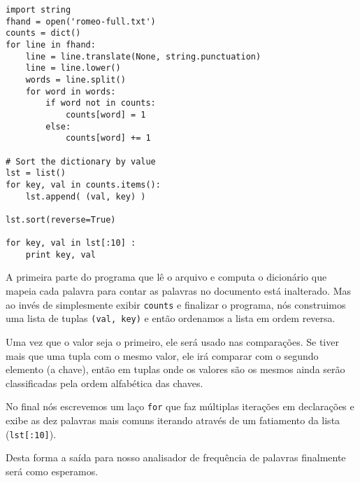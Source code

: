 \beforeverb
\begin{verbatim}
import string
fhand = open('romeo-full.txt')
counts = dict()
for line in fhand:
    line = line.translate(None, string.punctuation)
    line = line.lower()
    words = line.split()
    for word in words:
        if word not in counts:
            counts[word] = 1
        else:
            counts[word] += 1

# Sort the dictionary by value
lst = list()
for key, val in counts.items():
    lst.append( (val, key) )

lst.sort(reverse=True)

for key, val in lst[:10] :
    print key, val
\end{verbatim}
\afterverb
%
A primeira parte do programa que lê o arquivo e computa o dicionário que
mapeia cada palavra para contar as palavras no documento está inalterado. Mas 
ao invés de simplesmente exibir {\tt counts} e finalizar o programa, nós
construimos uma lista de tuplas {\tt (val, key)} e então ordenamos a
lista em ordem reversa.

Uma vez que o valor seja o primeiro, ele será usado nas comparações. Se tiver
mais que uma tupla com o mesmo valor, ele irá comparar com o segundo elemento
(a chave), então em tuplas onde os valores são os mesmos ainda serão
classificadas pela ordem alfabética das chaves.

No final nós escrevemos um laço {\tt for} que faz múltiplas iterações em
declarações e exibe as dez palavras mais comuns iterando através de um
fatiamento da lista ({\tt lst[:10]}).

Desta forma a saída para nosso analisador de frequência de palavras finalmente
será como esperamos.


